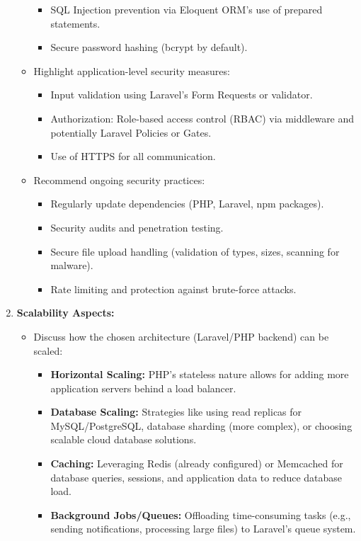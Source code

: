 \begin{enumerate}
\begin{itemize}
\begin{itemize}
            \item SQL Injection prevention via Eloquent ORM's use of prepared statements.
            \item Secure password hashing (bcrypt by default).
        \end{itemize}
        \item Highlight application-level security measures:
        \begin{itemize}
            \item Input validation using Laravel's Form Requests or validator.
            \item Authorization: Role-based access control (RBAC) via middleware and potentially Laravel Policies or Gates.
            \item Use of HTTPS for all communication.
        \end{itemize}
        \item Recommend ongoing security practices:
        \begin{itemize}
            \item Regularly update dependencies (PHP, Laravel, npm packages).
            \item Security audits and penetration testing.
            \item Secure file upload handling (validation of types, sizes, scanning for malware).
            \item Rate limiting and protection against brute-force attacks.
        \end{itemize}
    \end{itemize}
    \item \textbf{Scalability Aspects:}
    \begin{itemize}
        \item Discuss how the chosen architecture (Laravel/PHP backend) can be scaled:
        \begin{itemize}
            \item \textbf{Horizontal Scaling:} PHP's stateless nature allows for adding more application servers behind a load balancer.
            \item \textbf{Database Scaling:} Strategies like using read replicas for MySQL/PostgreSQL, database sharding (more complex), or choosing scalable cloud database solutions.
            \item \textbf{Caching:} Leveraging Redis (already configured) or Memcached for database queries, sessions, and application data to reduce database load.
            \item \textbf{Background Jobs/Queues:} Offloading time-consuming tasks (e.g., sending notifications, processing large files) to Laravel's queue system.

\end{itemize}
\end{itemize}
\end{enumerate}
